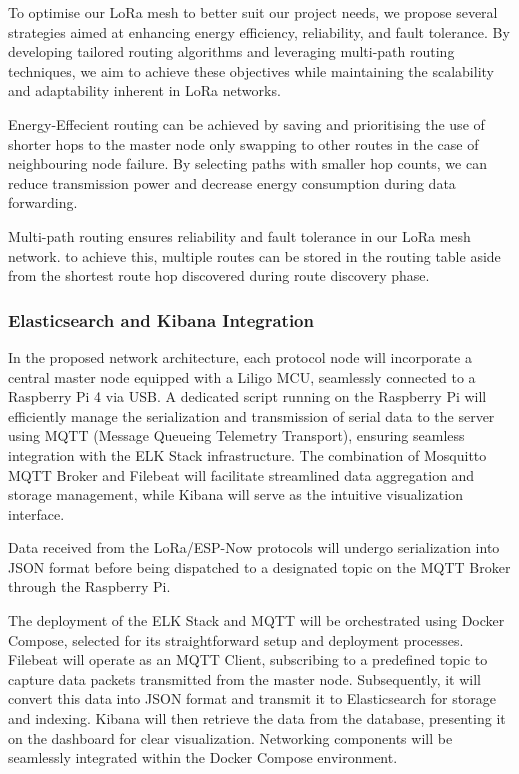 To optimise our LoRa mesh to better suit our project needs, we propose several strategies aimed at enhancing energy efficiency, reliability, and fault tolerance. By developing tailored routing algorithms and leveraging multi-path routing techniques, we aim to achieve these objectives while maintaining the scalability and adaptability inherent in LoRa networks.

Energy-Effecient routing can be achieved by saving and prioritising the use of shorter hops to the master node only swapping to other routes in the case of neighbouring node failure. By selecting paths with smaller hop counts, we can reduce transmission power and decrease energy consumption during data forwarding.

Multi-path routing ensures reliability and fault tolerance in our LoRa mesh network. to achieve this, multiple routes can be stored in the routing table aside from the shortest route hop discovered during route discovery phase.

\subsubsection{Elasticsearch and Kibana Integration}

In the proposed network architecture, each protocol node will incorporate a central master node equipped with a Liligo MCU, seamlessly connected to a Raspberry Pi 4 via USB. A dedicated script running on the Raspberry Pi will efficiently manage the serialization and transmission of serial data to the server using MQTT (Message Queueing Telemetry Transport), ensuring seamless integration with the ELK Stack infrastructure. The combination of Mosquitto MQTT Broker and Filebeat will facilitate streamlined data aggregation and storage management, while Kibana will serve as the intuitive visualization interface.

Data received from the LoRa/ESP-Now protocols will undergo serialization into JSON format before being dispatched to a designated topic on the MQTT Broker through the Raspberry Pi.

The deployment of the ELK Stack and MQTT will be orchestrated using Docker Compose, selected for its straightforward setup and deployment processes. Filebeat will operate as an MQTT Client, subscribing to a predefined topic to capture data packets transmitted from the master node. Subsequently, it will convert this data into JSON format and transmit it to Elasticsearch for storage and indexing. Kibana will then retrieve the data from the database, presenting it on the dashboard for clear visualization. Networking components will be seamlessly integrated within the Docker Compose environment.


